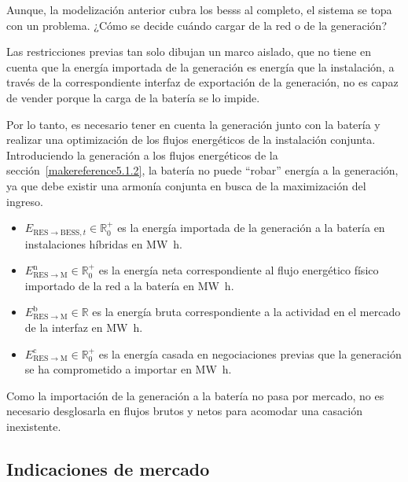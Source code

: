 Aunque, la modelización anterior cubra los \glspl{bess} al completo, el sistema se topa con un problema. ¿Cómo se decide cuándo cargar de la red o de la generación?

Las restricciones previas tan solo dibujan un marco aislado, que no tiene en cuenta que la energía importada de la generación es energía que la instalación, a través de la correspondiente interfaz de exportación de la generación, no es capaz de vender porque la carga de la batería se lo impide.

Por lo tanto, es necesario tener en cuenta la generación junto con la batería y realizar una optimización de los flujos energéticos de la instalación conjunta. Introduciendo la generación a los flujos energéticos de la sección~\ref{makereference5.1.2}, la batería no puede ``robar'' energía a la generación, ya que debe existir una armonía conjunta en busca de la maximización del ingreso.

\begin{itemize}

  \item \( E_{\mathrm{RES} \rightarrow \mathrm{BESS}, t} \in \mathbb{R}^{+}_{0} \) es la energía importada de la generación a la batería en instalaciones híbridas en \si{{\mega\watt\hour}}.

  \item \( E^{\mathrm{n}}_{\mathrm{RES} \rightarrow \mathrm{M}} \in \mathbb{R}^{+}_{0} \) es la energía neta correspondiente al flujo energético físico importado de la red a la batería en \si{{\mega\watt\hour}}.

  \item \( E^{\mathrm{b}}_{\mathrm{RES} \rightarrow \mathrm{M}} \in \mathbb{R} \) es la energía bruta correspondiente a la actividad en el mercado de la interfaz en \si{{\mega\watt\hour}}.

  \item \( E^{\mathrm{c}}_{\mathrm{RES} \rightarrow \mathrm{M}} \in \mathbb{R}^{+}_{0} \) es la energía casada en negociaciones previas que la generación se ha comprometido a importar en \si{{\mega\watt\hour}}.

\end{itemize}

Como la importación de la generación a la batería no pasa por mercado, no es necesario desglosarla en flujos brutos y netos para acomodar una casación inexistente.

\subsection{Indicaciones de mercado}%
\label{makereference5.1.4}

